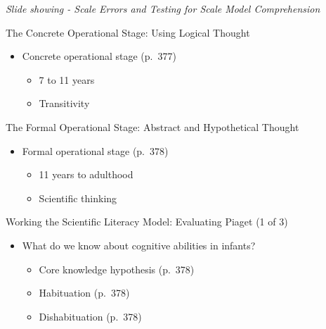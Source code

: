 \documentclass[
]{book}
\providecommand{\tightlist}{%
  \setlength{\itemsep}{0pt}\setlength{\parskip}{0pt}}
\begin{document}
\begin{reflect}
\emph{Slide showing - Scale Errors and Testing for Scale Model Comprehension}

The Concrete Operational Stage: Using Logical Thought

\begin{itemize}
\tightlist
\item
  Concrete operational stage (p.~377)

  \begin{itemize}
  \tightlist
  \item
    7 to 11 years\\
  \item
    Transitivity
  \end{itemize}
\end{itemize}

The Formal Operational Stage: Abstract and Hypothetical Thought

\begin{itemize}
\tightlist
\item
  Formal operational stage (p.~378)

  \begin{itemize}
  \tightlist
  \item
    11 years to adulthood\\
  \item
    Scientific thinking
  \end{itemize}
\end{itemize}

Working the Scientific Literacy Model: Evaluating Piaget (1 of 3)

\begin{itemize}
\tightlist
\item
  What do we know about cognitive abilities in infants?

  \begin{itemize}
  \tightlist
  \item
    Core knowledge hypothesis (p.~378)\\
  \item
    Habituation (p.~378)\\
  \item
    Dishabituation (p.~378)
  \end{itemize}
\end{itemize}


\end{reflect}
\end{document}
